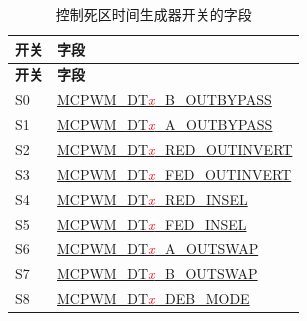 \begin{longtable}[c]{ |p{4cm}|p{6cm}| }
    \caption{控制死区时间生成器开关的字段}
    \label{tab:mcpwm-s-dt}
    \\\hline
    \rowcolor{lightgray}
    \textbf{开关}
    & \textbf{字段}
    \\\hline
    \endfirsthead
    \hline
    \rowcolor{lightgray}   
    \textbf{开关}
    & \textbf{字段}
    \\\hline
    \endhead
    \hline
    \endfoot
    S0
    & \hyperref[fielddesc:MCPWMDT0BOUTBYPASS]{MCPWM\_DT\textcolor{red}{\it{x}}\_B\_OUTBYPASS}
    \\\hline
    S1
    & \hyperref[fielddesc:MCPWMDT0AOUTBYPASS]{MCPWM\_DT\textcolor{red}{\it{x}}\_A\_OUTBYPASS}
    \\\hline
    S2
    & \hyperref[fielddesc:MCPWMDT0REDOUTINVERT]{MCPWM\_DT\textcolor{red}{\it{x}}\_RED\_OUTINVERT}
    \\\hline
    S3
    & \hyperref[fielddesc:MCPWMDT0FEDOUTINVERT]{MCPWM\_DT\textcolor{red}{\it{x}}\_FED\_OUTINVERT}
    \\\hline
    S4
    & \hyperref[fielddesc:MCPWMDT0REDINSEL]{MCPWM\_DT\textcolor{red}{\it{x}}\_RED\_INSEL}
    \\\hline
    S5
    & \hyperref[fielddesc:MCPWMDT0FEDINSEL]{MCPWM\_DT\textcolor{red}{\it{x}}\_FED\_INSEL}
    \\\hline
    S6
    & \hyperref[fielddesc:MCPWMDT0AOUTSWAP]{MCPWM\_DT\textcolor{red}{\it{x}}\_A\_OUTSWAP}
    \\\hline
    S7
    & \hyperref[fielddesc:MCPWMDT0BOUTSWAP]{MCPWM\_DT\textcolor{red}{\it{x}}\_B\_OUTSWAP}
    \\\hline
    S8
    & \hyperref[fielddesc:MCPWMDT0DEBMODE]{MCPWM\_DT\textcolor{red}{\it{x}}\_DEB\_MODE}
    \\\hline
\end{longtable}